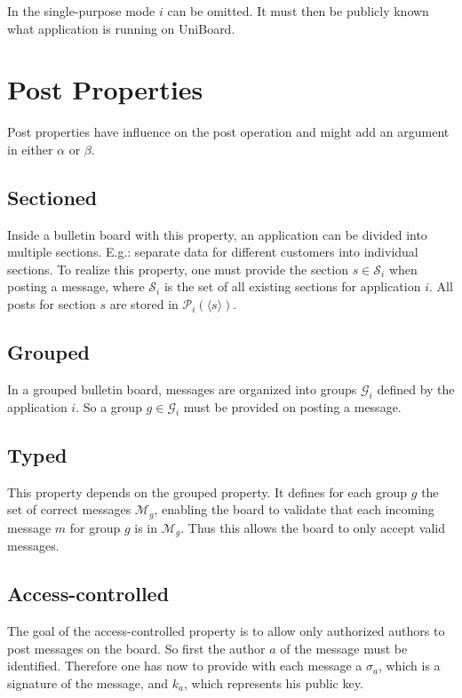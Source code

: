 \documentclass[bibtotoc,halfparskip,oneside]{scrreprt}
\begin{document}
In the single-purpose mode $i$ can be omitted. It must then be publicly known what application is running on UniBoard.

\section{Post Properties}
Post properties have influence on the post operation and might add an argument in either $\alpha$ or $\beta$.
\subsection{Sectioned}

Inside a bulletin board with this property, an application can be divided into multiple sections. E.g.: separate data for different customers into individual sections. To realize this property, one must provide the section $s\in\mathcal{S}_i$ when posting a message, where $\mathcal{S}_i$ is the set of all existing sections for application $i$. All posts for section $s$ are stored in $\mathcal{P}_i(\langle s\rangle)$.

\subsection{Grouped}

In a grouped bulletin board, messages are organized into groups $\mathcal{G}_i$ defined by the application $i$. So a group $g\in\mathcal{G}_i$ must be provided on posting a message. 

\subsection{Typed}

This property depends on the grouped property. It defines for each group $g$ the set of correct messages $\mathcal{M}_g$, enabling the board to validate that each incoming message $m$ for group $g$ is in $\mathcal{M}_g$. Thus this allows the board to only accept valid messages.

\subsection{Access-controlled}
The goal of the access-controlled property is to allow only authorized authors to post messages on the board. So first the author $a$ of the message must be identified. Therefore one has now to provide with each message a $\sigma_a$, which is a signature of the message, and $k_a$, which represents his public key.
\end{document}
